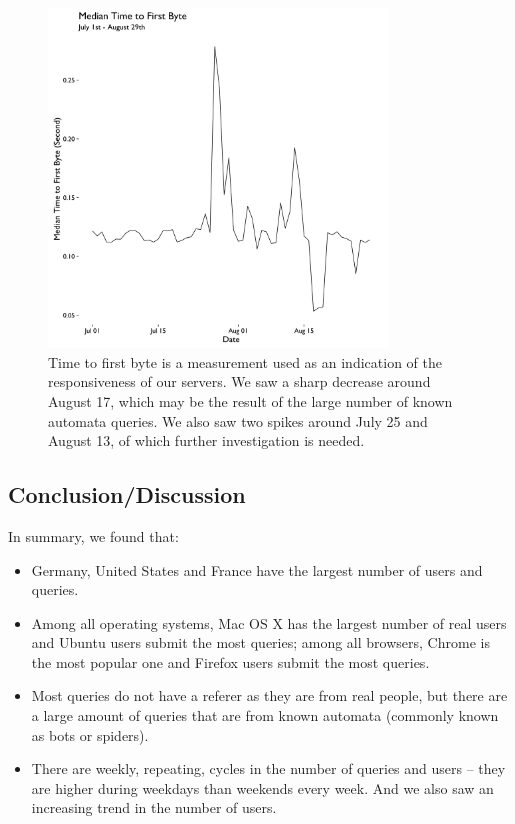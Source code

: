 \documentclass[12pt,]{article}
\providecommand{\tightlist}{%
  \setlength{\itemsep}{0pt}\setlength{\parskip}{0pt}}
\begin{document}
\begin{figure}[H]
\centering
\includegraphics[width=9cm,height=9cm,keepaspectratio]{figures/median_time_firstbyte_ts.png}
\caption{Time to first byte is a measurement used as an indication of
the responsiveness of our servers. We saw a sharp decrease around August
17, which may be the result of the large number of known automata queries. We
also saw two spikes around July 25 and August 13, of which further
investigation is needed.}
\end{figure}

\newpage

\subsection{Conclusion/Discussion}\label{conclusiondiscussion}

In summary, we found that:

\begin{itemize}
\tightlist
\item
  Germany, United States and France have the largest number of users and
  queries.
\item
  Among all operating systems, Mac OS X has the largest number of real users and Ubuntu users 
  submit the most queries; among all browsers, Chrome is the most popular one and Firefox users 
  submit the most queries.
\item
  Most queries do not have a referer as they are from real people, but there are a large amount of 
  queries that are from known automata (commonly known as bots or spiders).
\item
  There are weekly, repeating, cycles in the number of queries and users -- they are higher during 
  weekdays than weekends every week. And we
  also saw an increasing trend in the number of users.
\end{itemize}
\end{document}
